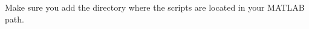 \documentclass[10pt,a4paper,onepage,DIV12]{scrartcl}
\begin{document}
Make sure you add the directory where the scripts are located in your MATLAB path.
% 
% 
% 
% 
% 
\end{document}
